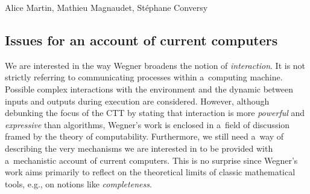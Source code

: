 \begin{artengenv2auth}{Alice Martin, Mathieu Magnaudet, Stéphane Conversy}
\subsection{Issues for an account of current computers}

We are interested in the way Wegner broadens the notion of \textit{interaction}. It is not strictly referring to communicating processes within a~computing machine. Possible complex interactions with the environment and the dynamic between inputs and outputs during execution are considered. However, although debunking the focus of the CTT by stating that interaction is more \textit{powerful} and \textit{expressive} than algorithms, Wegner’s work is enclosed in a~field of discussion framed by the theory of computability. 
Furthermore, we still need a~way of describing the very mechanisms we are interested in to be provided with a~mechanistic account of current computers. This is no surprise since Wegner’s work aims primarily to reflect on the theoretical limits of classic mathematical tools, e.g., on notions like \textit{completeness}.



\end{artengenv2auth}
